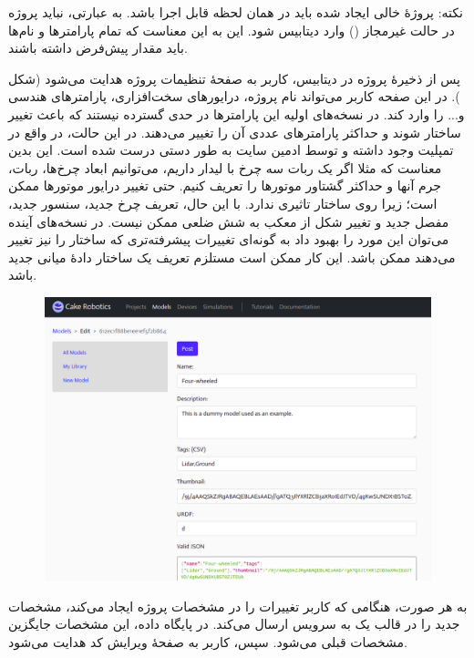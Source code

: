\documentclass{cake-classes/short-report-fa}
\newcommand{\ورب}[1]{\lr{\Verb!#1!}}
\begin{document}
نکته: پروژهٔ خالی ایجاد شده باید در همان لحظه قابل اجرا باشد. به عبارتی، نباید پروژه در حالت غیرمجاز () وارد دیتابیس شود. این به این معناست که تمام پارامترها و نام‌ها باید مقدار پیش‌فرض داشته باشند.

پس از ذخیرهٔ پروژه در دیتابیس، کاربر به صفحهٔ تنظیمات پروژه هدایت می‌شود (شکل ). در این صفحه کاربر می‌تواند نام پروژه، درایورهای سخت‌افزاری، پارامترهای هندسی و... را وارد کند. در نسخه‌های اولیه این پارامترها در حدی گسترده نیستند که باعث تغییر ساختار  شوند و حداکثر پارامترهای عددی آن را تغییر می‌دهند. در این حالت، در واقع  در تمپلیت وجود داشته و توسط ادمین سایت به طور دستی درست شده است. این بدین معناست که مثلا اگر یک ربات سه چرخ با لیدار داریم، می‌توانیم ابعاد چرخ‌ها، ربات، جرم آنها و حداکثر گشتاور موتورها را تعریف کنیم. حتی تغییر درایور موتورها ممکن است؛ زیرا روی ساختار  تاثیری ندارد. با این حال، تعریف چرخ جدید، سنسور جدید، مفصل جدید و تغییر شکل از معکب به شش ضلعی ممکن نیست. در نسخه‌های آینده می‌توان این مورد را بهبود داد به گونه‌ای تغییرات پیشرفته‌تری که ساختار  را نیز تغییر می‌دهند ممکن باشد. این کار ممکن است مستلزم تعریف یک ساختار دادهٔ میانی جدید باشد.

\begin{figure}[h]
	\centering
	\includegraphics[width=\linewidth]{img/project-props.png}
\end{figure}

به هر صورت، هنگامی که کاربر تغییرات را در مشخصات پروژه ایجاد می‌کند، مشخصات جدید را در قالب یک  به سرویس  ارسال می‌کند. در پایگاه داده، این مشخصات جایگزین مشخصات قبلی می‌شود. سپس، کاربر به صفحهٔ ویرایش کد هدایت می‌شود.
\end{document}
